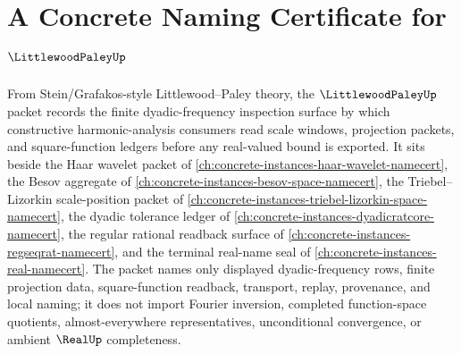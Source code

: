 \chapter{A Concrete Naming Certificate for $\LittlewoodPaleyUp$}
\label{ch:concrete-instances-littlewood-paley-namecert}

From Stein/Grafakos-style Littlewood--Paley theory, the $\LittlewoodPaleyUp$ packet records the finite dyadic-frequency inspection surface by which constructive harmonic-analysis consumers read scale windows, projection packets, and square-function ledgers before any real-valued bound is exported. It sits beside the Haar wavelet packet of \autoref{ch:concrete-instances-haar-wavelet-namecert}, the Besov aggregate of \autoref{ch:concrete-instances-besov-space-namecert}, the Triebel--Lizorkin scale-position packet of \autoref{ch:concrete-instances-triebel-lizorkin-space-namecert}, the dyadic tolerance ledger of \autoref{ch:concrete-instances-dyadicratcore-namecert}, the regular rational readback surface of \autoref{ch:concrete-instances-regseqrat-namecert}, and the terminal real-name seal of \autoref{ch:concrete-instances-real-namecert}. The packet names only displayed dyadic-frequency rows, finite projection data, square-function readback, transport, replay, provenance, and local naming; it does not import Fourier inversion, completed function-space quotients, almost-everywhere representatives, unconditional convergence, or ambient $\RealUp$ completeness.

